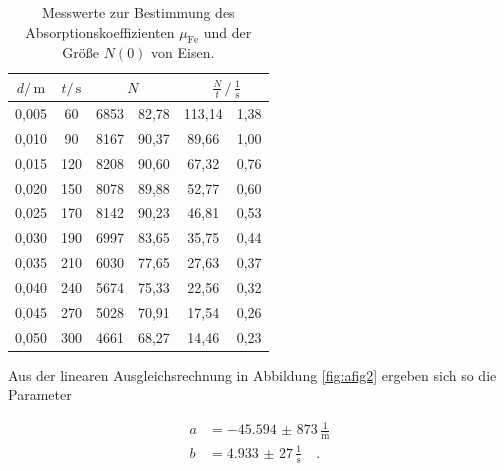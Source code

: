 \FloatBarrier
\begin{table}[h]
    \centering
    \caption{Messwerte zur Bestimmung des Absorptionskoeffizienten $\mu_\text{Fe}$ und der Größe $N\left(0\right)$ von Eisen.}
    \label{tab:atab3}
    \begin{tabular}{S[table-format=1.3] S[table-format=3.0] S[table-format=4.0] @{${}\pm{}$} S[table-format=2.2] S[table-format=3.2] @{${}\pm{}$} S[table-format=1.2]}
        \toprule
        {$d / \, \si{\meter}$} & {$t / \, \si{\second}$} &  &  \\
        ,005 & 60  & 6853 & 82,78 & 113,14 & 1,38 \\
        0,010 & 90  & 8167 & 90,37 & 89,66  & 1,00 \\
        0,015 & 120 & 8208 & 90,60 & 67,32  & 0,76 \\
        0,020 & 150 & 8078 & 89,88 & 52,77  & 0,60 \\
        0,025 & 170 & 8142 & 90,23 & 46,81  & 0,53 \\
        0,030 & 190 & 6997 & 83,65 & 35,75  & 0,44 \\
        0,035 & 210 & 6030 & 77,65 & 27,63  & 0,37 \\
        0,040 & 240 & 5674 & 75,33 & 22,56  & 0,32 \\
        0,045 & 270 & 5028 & 70,91 & 17,54  & 0,26 \\
        0,050 & 300 & 4661 & 68,27 & 14,46  & 0,23 \\
        \bottomrule
    \end{tabular}
\end{table}
\FloatBarrier
\noindent

Aus der linearen Ausgleichsrechnung in Abbildung \ref{fig:afig2} ergeben sich so die Parameter 

\begin{align*}
    a &= \num{-45,594(873)} \, \frac{1}{\si{\meter}}\\
    b &= \num{4,933(27)} \, \frac{1}{\si{\second}} \quad .
\end{align*}

